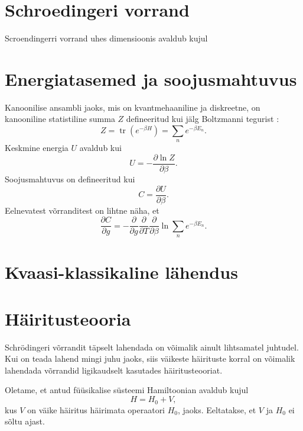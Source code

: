 \documentclass{trkut}%
\DeclareMathOperator{\tr}{tr}
\begin{document}
\section{Schroedingeri vorrand}

Scroendingerri vorrand uhes dimensioonis avaldub kujul
\begin{equation}
    
\end{equation}


\section{Energiatasemed ja soojusmahtuvus}

Kanoonilise ansambli jaoks, mis on kvantmehaaniline ja diskreetne, on kanooniline statistiline summa \(Z\) defineeritud kui jälg Boltzmanni tegurist \cite{kardar07}:
\begin{equation}
    Z=\tr(e^{-\beta H})=\sum_{n} e^{-\beta E_n}.
\end{equation}
Keskmine energia \(U\) avaldub kui \cite{kardar07}
\begin{equation}
    U=- \frac{\partial \ln Z}{\partial \beta}.
\end{equation}
Soojusmahtuvus on defineeritud kui 
\begin{equation}
    C=\frac{\partial U}{\partial \beta}.
\end{equation}
Eelnevatest võrranditest on lihtne näha, et
\begin{equation}
    \frac{\partial C}{\partial g}=- \frac{\partial}{\partial g}  \frac{\partial}{\partial T} \frac{\partial}{\partial \beta} \ln {\sum_{n} e^{-\beta E_n}}.
\end{equation}

\section{Kvaasi-klassikaline lähendus}

\section{Häiritusteooria}

Schrödingeri võrrandit täpselt lahendada on võimalik ainult lihtsamatel juhtudel. Kui on teada lahend mingi juhu jaoks, siis väikeste häirituste korral on võimalik lahendada võrrandid ligikaudselt kasutades häiritusteooriat. 

Oletame, et antud füüsikalise süsteemi Hamiltoonian avaldub kujul 
\begin{equation}
    H=H_0+V,
\end{equation}
kus \(V\) on väike häiritus häirimata operaatori \(H_0\), jaoks. Eeltatakse, et \(V\) ja \(H_0\) ei sõltu ajast. 
\end{document}
